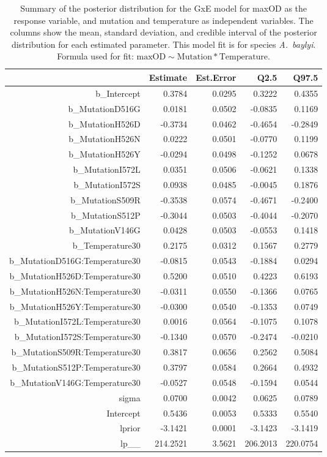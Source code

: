 \begin{table}[ht]
\centering
\begin{tabular}{rrrrr}
  \hline
 & Estimate & Est.Error & Q2.5 & Q97.5 \\ 
  \hline
b\_Intercept & 0.3784 & 0.0295 & 0.3222 & 0.4355 \\ 
  b\_MutationD516G & 0.0181 & 0.0502 & -0.0835 & 0.1169 \\ 
  b\_MutationH526D & -0.3734 & 0.0462 & -0.4654 & -0.2849 \\ 
  b\_MutationH526N & 0.0222 & 0.0501 & -0.0770 & 0.1199 \\ 
  b\_MutationH526Y & -0.0294 & 0.0498 & -0.1252 & 0.0678 \\ 
  b\_MutationI572L & 0.0351 & 0.0506 & -0.0621 & 0.1338 \\ 
  b\_MutationI572S & 0.0938 & 0.0485 & -0.0045 & 0.1876 \\ 
  b\_MutationS509R & -0.3538 & 0.0574 & -0.4671 & -0.2400 \\ 
  b\_MutationS512P & -0.3044 & 0.0503 & -0.4044 & -0.2070 \\ 
  b\_MutationV146G & 0.0428 & 0.0503 & -0.0553 & 0.1418 \\ 
  b\_Temperature30 & 0.2175 & 0.0312 & 0.1567 & 0.2779 \\ 
  b\_MutationD516G:Temperature30 & -0.0815 & 0.0543 & -0.1884 & 0.0294 \\ 
  b\_MutationH526D:Temperature30 & 0.5200 & 0.0510 & 0.4223 & 0.6193 \\ 
  b\_MutationH526N:Temperature30 & -0.0311 & 0.0550 & -0.1366 & 0.0765 \\ 
  b\_MutationH526Y:Temperature30 & -0.0300 & 0.0540 & -0.1353 & 0.0749 \\ 
  b\_MutationI572L:Temperature30 & 0.0016 & 0.0564 & -0.1075 & 0.1078 \\ 
  b\_MutationI572S:Temperature30 & -0.1340 & 0.0570 & -0.2474 & -0.0210 \\ 
  b\_MutationS509R:Temperature30 & 0.3817 & 0.0656 & 0.2562 & 0.5084 \\ 
  b\_MutationS512P:Temperature30 & 0.3797 & 0.0584 & 0.2664 & 0.4932 \\ 
  b\_MutationV146G:Temperature30 & -0.0527 & 0.0548 & -0.1594 & 0.0544 \\ 
  sigma & 0.0700 & 0.0042 & 0.0625 & 0.0789 \\ 
  Intercept & 0.5436 & 0.0053 & 0.5333 & 0.5540 \\ 
  lprior & -3.1421 & 0.0001 & -3.1423 & -3.1419 \\ 
  lp\_\_ & 214.2521 & 3.5621 & 206.2013 & 220.0754 \\ 
   \hline
\end{tabular}
\caption{Summary of the posterior distribution for the GxE model for maxOD as the response variable, and mutation and temperature as independent variables. The columns show the mean, standard deviation, and credible interval of the posterior distribution for each estimated parameter. This model fit is for species \textit{A.~baylyi}.  Formula used for fit: $\text{maxOD} \sim \text{Mutation} * \text{Temperature}$.} 
\label{supptab:GxE_maxOD_Abaylyi}
\end{table}



